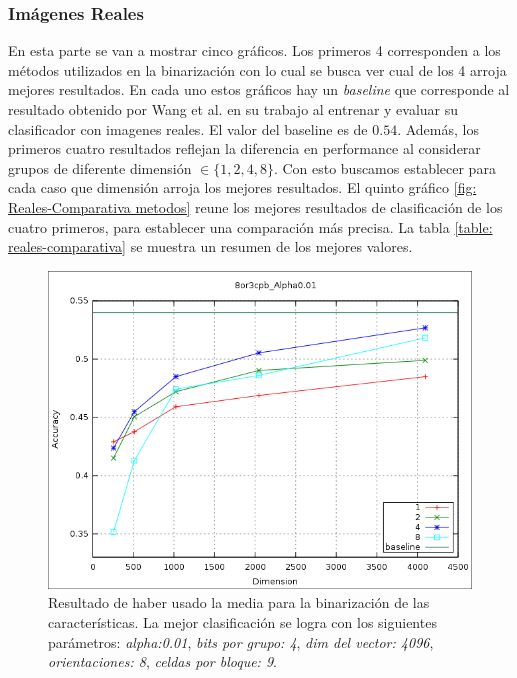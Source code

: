 	\subsubsection{Imágenes Reales}
	
	En esta parte se van a mostrar cinco gráficos. Los primeros 4 corresponden a los métodos utilizados en la binarización con lo cual se busca ver cual de los 4 arroja mejores resultados. En cada uno estos gráficos hay un \textit{baseline} que corresponde al resultado obtenido por Wang et al. en su trabajo al entrenar y evaluar su clasificador con imagenes reales. El valor del baseline es de $0.54$. Además, los primeros cuatro resultados reflejan la diferencia en performance al considerar grupos de diferente dimensión $\in \{ 1, 2, 4, 8\}$. Con esto buscamos establecer para cada caso que dimensión arroja los mejores resultados. El quinto gráfico \ref{fig: Reales-Comparativa metodos} reune los mejores resultados de clasificación de los cuatro primeros, para establecer una comparación más precisa. La tabla \ref{table: reales-comparativa} se muestra un resumen de los mejores valores.
		
			\begin{figure}[htbp!]
				\centering
				\includegraphics[scale=0.6]{img/resultados/reales/media_8or3cpb_Alpha0,01.png}
				\caption[Reales con umbral media]{Resultado de haber usado la media para la binarización de las características. La mejor clasificación se logra con los siguientes parámetros: \textit{alpha:0.01}, \textit{bits por grupo: 4}, \textit{dim del vector: 4096}, \textit{orientaciones: 8}, \textit{celdas por bloque: 9}.}
				\label{fig: Reales-media-8or9cpbAlph0.01}
			\end{figure}
			
